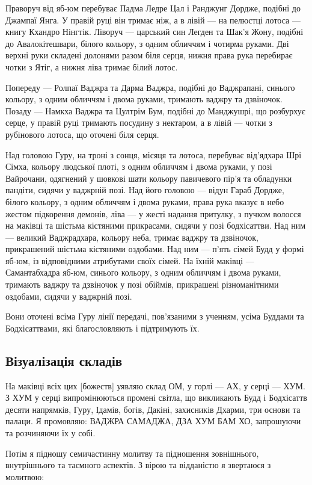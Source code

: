 \documentclass{article}
\begin{document}
Праворуч від яб-юм перебуває Падма Ледре Цал і Ранджунг Дордже,
подібні до Джампаї Янга. У правій руці він тримає ніж, а в лівій — на
пелюстці лотоса — книгу Кхандро Нінгтік. Ліворуч — царський син Легден
та Шак’я Жону, подібні до Авалокітешвари, білого кольору, з одним
обличчям і чотирма руками. Дві верхні руки складені долонями разом
біля серця, нижня права рука перебирає чотки з Ятіг, а нижня ліва
тримає білий лотос.

Попереду — Ролпаї Ваджра та Дарма Ваджра, подібні до Ваджрапані,
синього кольору, з одним обличчям і двома руками, тримають ваджру
та дзвіночок. Позаду — Намкха Ваджра та Цултрім Бум, подібні до
Манджушрі, що розбурхує серце, у правій руці тримають посудину з
нектаром, а в лівій — чотки з рубінового лотоса, що оточені біля серця.

Над головою Гуру, на троні з сонця, місяця та лотоса, перебуває від'ядхара
Шрі Сімха, кольору людської плоті, з одним обличчям і двома руками,
у позі Вайрочани, одягнений у шовкові шати кольору павичевого пір’я
та обладунки пандіти, сидячи у ваджрній позі. Над його головою — відун
Гараб Дордже, білого кольору, з одним обличчям і двома руками, права
рука вказує в небо жестом підкорення демонів, ліва — у жесті надання
притулку, з пучком волосся на маківці та шістьма кістяними прикрасами,
сидячи у позі бодхісаттви. Над ним — великий Ваджрадхара, кольору неба,
тримає ваджру та дзвіночок, прикрашений шістьма кістяними оздобами.
Над ним — п’ять сімей Будд у формі яб-юм, із відповідними атрибутами
своїх сімей. На їхній маківці — Самантабхадра яб-юм, синього кольору,
з одним обличчям і двома руками, тримають ваджру та дзвіночок у позі
обіймів, прикрашені різноманітними оздобами, сидячи у ваджрній позі.

Вони оточені всіма Гуру лінії передачі, пов’язаними з ученням, усіма
Буддами та Бодхісаттвами, які благословляють і підтримують їх.

\subsection{Візуалізація складів}

На маківці всіх цих [божеств] уявляю склад ОМ, у горлі — АХ, у
серці — ХУМ. З ХУМ у серці випромінюються промені світла, що
викликають Будд і Бодхісаттв десяти напрямків, Гуру, Ідамів,
богів, Дакіні, захисників Дхарми, три основи та палаци. Я промовляю:
ВАДЖРА САМАДЖА, ДЗА ХУМ БАМ ХО, запрошуючи та розчиняючи їх у собі.

Потім я підношу семичастинну молитву та підношення зовнішнього,
внутрішнього та таємного аспектів. З вірою та відданістю я звертаюся з молитвою:
\end{document}
